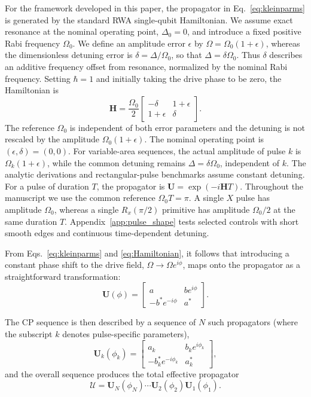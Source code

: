 \documentclass[10pt,aps,twocolumn,pra,floatfix,superscriptaddress]{revtex4-2}
\begin{document}
For the framework developed in this paper, the propagator in Eq.~\eqref{eq:kleinparms} is generated by the standard RWA single-qubit Hamiltonian. We assume exact resonance at the nominal operating point, $\Delta_0=0$, and introduce a fixed positive Rabi frequency $\Omega_0$. We define an amplitude error $\epsilon$ by $\Omega=\Omega_0(1+\epsilon)$, whereas the dimensionless detuning error is $\delta=\Delta/\Omega_0$, so that $\Delta=\delta\Omega_0$. Thus $\delta$ describes an additive frequency offset from resonance, normalized by the nominal Rabi frequency. Setting $\hbar=1$ and initially taking the drive phase to be zero, the Hamiltonian is
\begin{equation}
\mathbf{H} = \frac{\Omega_0}{2} \left[\begin{array}{cc} -\delta & 1+\epsilon \\ 1+\epsilon & \delta \end{array} \right].
\label{eq:Hamiltonian}
\end{equation}
The reference $\Omega_0$ is independent of both error parameters and the detuning is not rescaled by the amplitude $\Omega_0(1+\epsilon)$. The nominal operating point is $(\epsilon,\delta)=(0,0)$. For variable-area sequences, the actual amplitude of pulse $k$ is $\Omega_k(1+\epsilon)$, while the common detuning remains $\Delta=\delta\Omega_0$, independent of $k$.
The analytic derivations and rectangular-pulse benchmarks assume constant detuning. For a pulse of duration $T$, the propagator is $\mathbf{U}=\exp(-i\mathbf{H}T)$. Throughout the manuscript we use the common reference $\Omega_0T=\pi$. A single $X$ pulse has amplitude $\Omega_0$, whereas a single $R_x(\pi/2)$ primitive has amplitude $\Omega_0/2$ at the same duration $T$.
Appendix~\ref{app:pulse_shape} tests selected controls with short smooth edges and continuous time-dependent detuning.

From Eqs.~\eqref{eq:kleinparms} and \eqref{eq:Hamiltonian}, it follows that introducing a constant phase shift to the drive field, $\Omega \to \Omega e^{i\phi}$, maps onto the propagator as a straightforward transformation:
\begin{equation}
\mathbf{U}(\phi) = \left[\begin{array}{cc} a & b e^{i\phi} \\ -b^\ast e^{-i\phi} & a^\ast \end{array} \right] .
\end{equation}

The CP sequence is then described by a sequence of $N$ such propagators (where the subscript $k$ denotes pulse-specific parameters),
\begin{equation}
\mathbf{U}_k(\phi_k) = \left[\begin{array}{cc} a_k & b_k e^{i\phi_k} \\ -b_k^\ast e^{-i\phi_k} & a_k^\ast \end{array} \right] ,
\end{equation}
and the overall sequence produces the total effective propagator
\begin{equation}
\mathcal{U} = \mathbf{U}_N(\phi_N) \cdots \mathbf{U}_2(\phi_2) \mathbf{U}_1(\phi_1) .
\end{equation}
\end{document}
